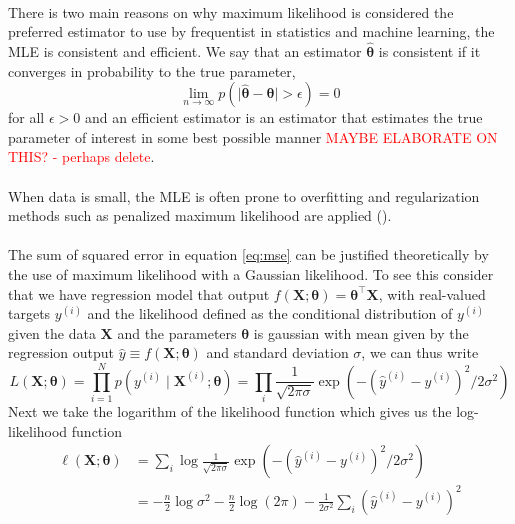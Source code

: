 \\
There is two main reasons on why maximum likelihood is considered the preferred estimator to use by frequentist in statistics and machine learning, the MLE is consistent and efficient. We say that an estimator $\hat{\boldsymbol{\theta}}$ is consistent if it converges in probability to the true parameter,
\begin{equation*}
    \lim_{n \rightarrow \infty} p\left(\mid\hat{\boldsymbol{\theta}}-\boldsymbol{\theta}\mid > \epsilon\right)=0
\end{equation*}
for all $\epsilon>0$ and an efficient estimator is an estimator that estimates the true parameter of interest in some best possible manner \textcolor{red}{MAYBE ELABORATE ON THIS? - perhaps delete}. \\
\\
When data is small, the MLE is often prone to overfitting and regularization methods such as penalized maximum likelihood are applied (\cite{hastie01statisticallearning}).\\
\\
The sum of squared error in equation \ref{eq:mse} can be justified theoretically by the use of maximum likelihood with a Gaussian likelihood.
To see this consider that we have regression model that output $f(\mathbf{X};\boldsymbol{\theta})=\boldsymbol{\theta}^\top\mathbf{X}$, with real-valued targets $y^{(i)}$ and the likelihood defined as the conditional distribution of $y^{(i)}$ given the data $\mathbf{X}$ and the parameters $\boldsymbol{\theta}$ is gaussian with mean given by the regression output $\hat{y}\equiv f(\mathbf{X};\boldsymbol{\theta})$ and standard deviation $\sigma$, we can thus write
\begin{equation*}
    L(\mathbf{X};\boldsymbol{\theta})=\prod_{i=1}^{N} p\left(y^{(i)} \mid \mathbf{X}^{(i)} ; \boldsymbol{\theta}\right)=\prod_i\frac{1}{\sqrt{2\pi\sigma}}\exp\left(-(\hat{y}^{(i)}-y^{(i)})^2/2\sigma^2\right)
\end{equation*}
Next we take the
logarithm of the likelihood function which gives us the log-likelihood function
\begin{equation*}
\begin{split}
        \ell(\mathbf{X};\boldsymbol{\theta})&=\sum_i\log\frac{1}{\sqrt{2\pi\sigma}}\exp\left(-(\hat{y}^{(i)}-y^{(i)})^2/2\sigma^2\right)\\
        &=-\frac{n}{2} \log \sigma^{2}-\frac{n}{2} \log (2 \pi)-\frac{1}{2 \sigma^{2}} \sum_{i}\left(\hat{y}^{(i)}-y^{(i)}\right)^{2}
\end{split}
\end{equation*}
